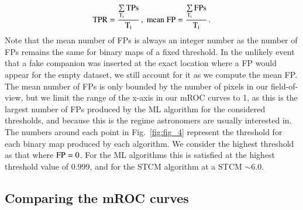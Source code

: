 \documentclass{aa}
\begin{document}
\begin{equation}
\rm{TPR} =\dfrac{\sum\limits_{T_i}\rm{TPs}}{T_i} \, , \; 
\rm{mean\; FP} = \dfrac{\sum\limits_{T_i}FPs}{T_i} \, .
\label{eq:TPR}
\end{equation}
Note that the mean number of FPs is always an integer number as the number of FPs remains the same for binary maps of a fixed threshold.
In the unlikely event that a fake companion was inserted at the exact location where a FP would appear for the empty dataset, we still account for it as we compute the mean FP. The mean number of FPs is only bounded by the number of pixels in our field-of-view, but we limit the range of the x-axis in our mROC curves to 1, as this is the largest number of FPs produced by the ML algorithm for the considered thresholds, and because this is the regime astronomers are usually interested in.
The numbers around each point in Fig.~\ref{fig:fig_4} represent the threshold for each binary map produced by each algorithm.
We consider the highest threshold as that where ${\rm FP} = 0$.
For the ML algorithms this is satisfied at the highest threshold value of $0.999$, and for the STCM algorithm at a STCM $\sim 6.0$. 


\subsection{Comparing the mROC curves}
\label{sec:roc}
\end{document}
